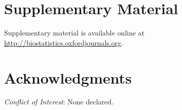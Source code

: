 \documentclass[oupdraft]{bio}
\begin{document}
\section{Supplementary Material}

Supplementary material is available online at
\url{http://biostatistics.oxfordjournals.org}.

\section*{Acknowledgments}

{\it Conflict of Interest}: None declared.




\end{document}
